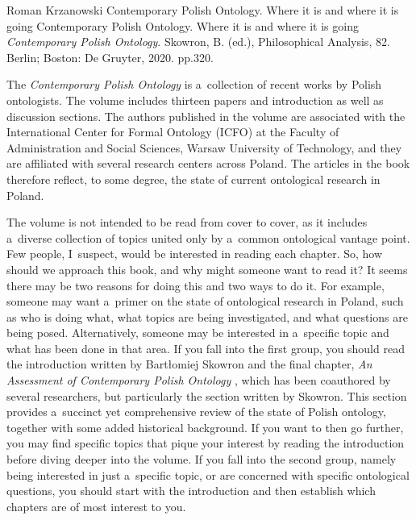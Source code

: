 \begin{recengenv}{Roman Krzanowski}
	{Contemporary Polish Ontology. Where it is and where it is going}
	{Contemporary Polish Ontology. Where it is and where it is going}
	{\textit{Contemporary Polish Ontology}. Skowron, B. (ed.), Philosophical Analysis, 82. Berlin; Boston: De Gruyter, 2020. pp.320.}

The \textit{Contemporary Polish Ontology} is a~collection of recent works by Polish ontologists. The volume includes thirteen papers and introduction as well as discussion sections. The authors published in the volume are associated with the International Center for Formal Ontology (ICFO) at the Faculty of Administration and Social Sciences, Warsaw University of Technology, and they are affiliated with several research centers across Poland. The articles in the book therefore reflect, to some degree, the state of current ontological research in Poland.

\enlargethispage{1.5\baselineskip}
The volume is not intended to be read from cover to cover, as it includes a~diverse collection of topics united only by a~common ontological vantage point. Few people, I~suspect, would be interested in reading each chapter. So, how should we approach this book, and why might someone want to read it? It seems there may be two reasons for doing this and two ways to do it. For example, someone may want a~primer on the state of ontological research in Poland, such as who is doing what, what topics are being investigated, and what questions are being posed. Alternatively, someone may be interested in a~specific topic and what has been done in that area. If you fall into the first group, you should read the introduction written by Bartłomiej Skowron and the final chapter, \textit{An Assessment of Contemporary Polish Ontology}
\parencite[][pp.271–294]{skowron_contemporary_2020}, %
 which has been coauthored by several researchers, but particularly the section written by Skowron. This section provides a~succinct yet comprehensive review of the state of Polish ontology, together with some added historical background. If you want to then go further, you may find specific topics that pique your interest by reading the introduction before diving deeper into the volume. If you fall into the second group, namely being interested in just a~specific topic, or are concerned with specific ontological questions, you should start with the introduction and then establish which chapters are of most interest to you.


\end{recengenv}
